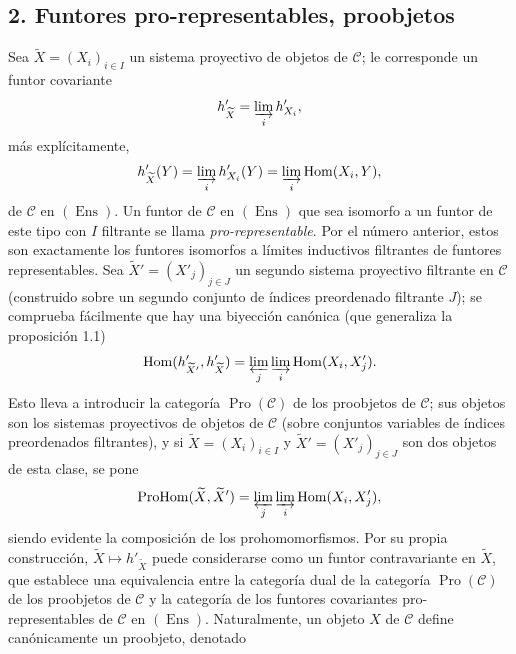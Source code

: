 \documentclass[11pt,twoside,openany]{book}
\numberwithin{equation}{section}
\theoremstyle{plain}
\theoremstyle{definition}
\theoremstyle{remark}
\theoremstyle{plain}
\theoremstyle{definition}
\theoremstyle{remark}
\begin{document}
\subsection*{2. Funtores pro-representables, proobjetos}

Sea $\widetilde X=(X_i)_{i\in I}$ un sistema proyectivo de objetos de
$\mathcal C$; le corresponde un funtor covariante
\[
  h'_{\widetilde X}=\varinjlim_i h'_{X_i},
\]
más explícitamente,
\[
  h'_{\widetilde X}(Y)=\varinjlim_i h'_{X_i}(Y)
  =\varinjlim_i\operatorname{Hom}(X_i,Y),
\]
de $\mathcal C$ en $(\operatorname{Ens})$. Un funtor de $\mathcal C$ en
$(\operatorname{Ens})$ que sea isomorfo a un funtor de este tipo con $I$
filtrante se llama \emph{pro-representable}. Por el número anterior, estos son
exactamente los funtores isomorfos a límites inductivos filtrantes de funtores
representables. Sea $\widetilde X'=(X'_j)_{j\in J}$ un segundo sistema
proyectivo filtrante en $\mathcal C$ (construido sobre un segundo conjunto de
índices preordenado filtrante $J$); se comprueba fácilmente que hay una
biyección canónica (que generaliza la proposición 1.1)
\[
  \operatorname{Hom}(h'_{\widetilde X'},h'_{\widetilde X})
  =\varprojlim_j\varinjlim_i\operatorname{Hom}(X_i,X'_j).
\]
Esto lleva a introducir la categoría $\operatorname{Pro}(\mathcal C)$ de los
proobjetos de $\mathcal C$; sus objetos son los sistemas proyectivos de objetos
de $\mathcal C$ (sobre conjuntos variables de índices preordenados filtrantes),
y si $\widetilde X=(X_i)_{i\in I}$ y
$\widetilde X'=(X'_j)_{j\in J}$ son dos objetos de esta clase, se pone
\[
  \operatorname{ProHom}(\widetilde X,\widetilde X')
  =\varprojlim_j\varinjlim_i\operatorname{Hom}(X_i,X'_j),
\]
siendo evidente la composición de los prohomomorfismos. Por su propia
construcción, $\widetilde X\longmapsto h'_{\widetilde X}$ puede considerarse
como un funtor contravariante en $\widetilde X$, que establece una equivalencia
entre la categoría dual de la categoría $\operatorname{Pro}(\mathcal C)$ de
los proobjetos de $\mathcal C$ y la categoría de los funtores covariantes
pro-representables de $\mathcal C$ en $(\operatorname{Ens})$. Naturalmente, un
objeto $X$ de $\mathcal C$ define canónicamente un proobjeto, denotado
\end{document}
